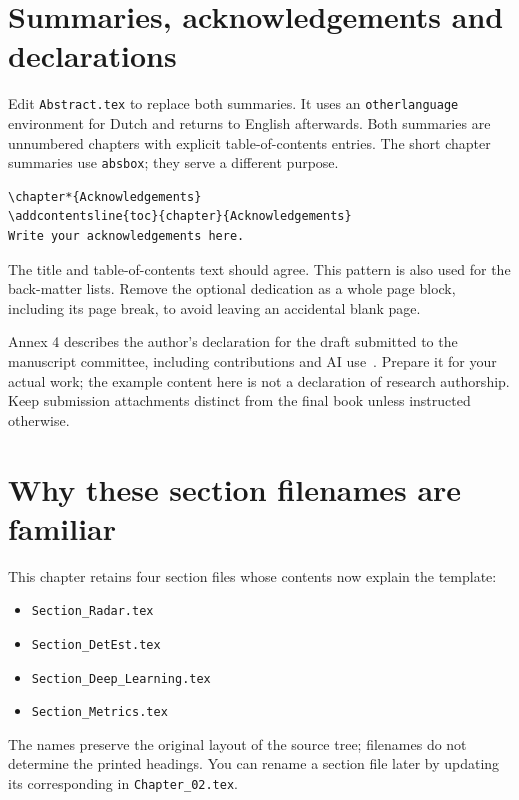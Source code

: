 
\section{Summaries, acknowledgements and declarations}
Edit \texttt{Abstract.tex} to replace both summaries. It uses an
\texttt{otherlanguage} environment for Dutch and returns to English afterwards.
Both summaries are unnumbered chapters with explicit table-of-contents entries.
The short chapter summaries use \texttt{absbox}; they serve a different purpose.

\begin{lstlisting}
\chapter*{Acknowledgements}
\addcontentsline{toc}{chapter}{Acknowledgements}
Write your acknowledgements here.
\end{lstlisting}
The title and table-of-contents text should agree. This pattern is also used for
the back-matter lists. Remove the optional dedication as a whole page block,
including its page break, to avoid leaving an accidental blank page.

Annex 4 describes the author's declaration for the draft submitted to the
manuscript committee, including contributions and AI use~\cite{ut2026}.
Prepare it for your actual work; the example content here is not a declaration
of research authorship. Keep submission attachments distinct from the final
book unless instructed otherwise.

\section{Why these section filenames are familiar}
This chapter retains four section files whose contents now explain the template:
\begin{itemize}
\item \texttt{Section\_Radar.tex}
\item \texttt{Section\_DetEst.tex}
\item \texttt{Section\_Deep\_Learning.tex}
\item \texttt{Section\_Metrics.tex}
\end{itemize}
The names preserve the original layout of the source tree; filenames do not
determine the printed headings. You can rename a section file later by updating
its corresponding \verb|| in \texttt{Chapter\_02.tex}.
